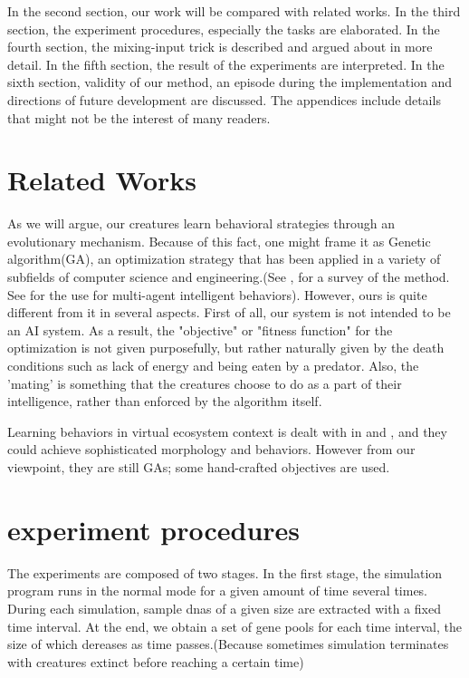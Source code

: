 \documentclass{article}
\numberwithin{equation}{section}
\begin{document}
	In the second section, our work will be compared with related works. In the third section, the experiment procedures, especially the tasks are elaborated. In the fourth section, the mixing-input trick is described and argued about in more detail. In the fifth section, the result of the experiments are interpreted. In the sixth section, validity of our method, an episode during the implementation and directions of future development are discussed. The appendices include details that might not be the interest of many readers. 

\section{Related Works}
	As we will argue, our creatures learn behavioral strategies through an evolutionary mechanism. Because of this fact, one might frame it as Genetic algorithm(GA), an optimization strategy that has been applied in a variety of subfields of computer science and engineering.(See \cite{ga_survey}, for a survey of the method. See \cite{lee} for the use for multi-agent intelligent behaviors). However, ours is quite different from it in several aspects. First of all, our system is not intended to be an AI system. As a result, the "objective" or "fitness function" for the optimization is not given purposefully, but rather naturally given by the death conditions such as lack of energy and being eaten by a predator. Also, the 'mating' is something that the creatures choose to do as a part of their intelligence, rather than enforced by the algorithm itself. 
	
	Learning behaviors in virtual ecosystem context is dealt with in \cite{sims} and \cite{jeremy}, and they could achieve sophisticated morphology and behaviors. However from our viewpoint, they are still GAs; some hand-crafted objectives are used.  

	
	
\section{experiment procedures}

The experiments are composed of two stages. In the first stage, the simulation program runs in the normal mode for a given amount of time several times. During each simulation, sample dnas of a given size are extracted with a fixed time interval. At the end, we obtain a set of gene pools for each time interval, the size of which dereases as time passes.(Because sometimes simulation terminates with creatures extinct before reaching a certain time) 
\end{document}
